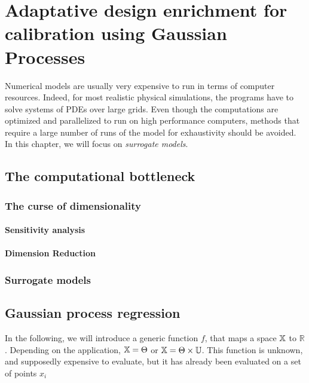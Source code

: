 \documentclass[../../Main_ManuscritThese.tex]{subfiles}
\begin{document}
\chapter{Adaptative design enrichment for calibration using Gaussian Processes}
\label{chap:adaptative_design_gp}
\minitoc
\newpage
\subfileLocal{\pagestyle{contentStyle}}



Numerical models are usually very expensive to run in terms of computer resources. Indeed, for most realistic physical simulations, the programs have to solve systems of PDEs over large grids. Even though the computations are optimized and parallelized to run on high performance computers, methods that require a large number of runs of the model for exhaustivity should be avoided. In this chapter, we will focus on \emph{surrogate models}.

\section{The computational bottleneck}

\subsection{The curse of dimensionality}

\subsubsection{Sensitivity analysis}

\subsubsection{Dimension Reduction}

\subsection{Surrogate models}



\section{Gaussian process regression}
In the following, we will introduce a generic function $f$, that maps a space $\mathbb{X}$ to $\mathbb{R}$. Depending on the application, $\mathbb{X} = \Theta$ or $\mathbb{X} = \Theta \times \mathbb{U}$. This function is unknown, and supposedly expensive to evaluate, but it has already been evaluated on a set of points $x_i$
\cite{rasmussen_gaussian_2006}
\end{document}
